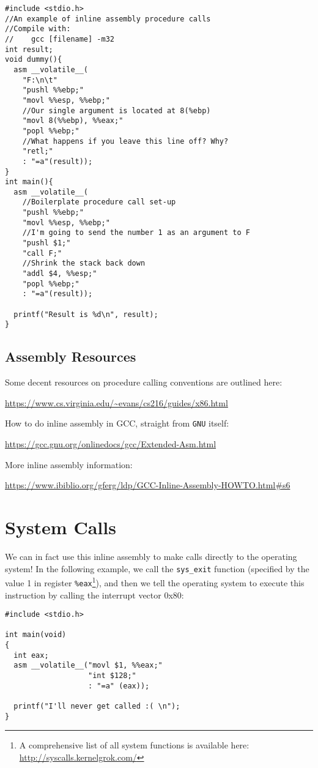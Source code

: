 \documentclass[10pt]{article}
\begin{document}
\begin{lstlisting}
#include <stdio.h>
//An example of inline assembly procedure calls
//Compile with:
//    gcc [filename] -m32
int result;
void dummy(){
  asm __volatile__(
    "F:\n\t"
    "pushl %%ebp;"
    "movl %%esp, %%ebp;"
    //Our single argument is located at 8(%ebp)
    "movl 8(%%ebp), %%eax;"
    "popl %%ebp;"
    //What happens if you leave this line off? Why?
    "retl;"
    : "=a"(result));
}
int main(){
  asm __volatile__(
    //Boilerplate procedure call set-up
    "pushl %%ebp;"
    "movl %%esp, %%ebp;"
    //I'm going to send the number 1 as an argument to F
    "pushl $1;"
    "call F;"
    //Shrink the stack back down
    "addl $4, %%esp;"
    "popl %%ebp;"
    : "=a"(result));

  printf("Result is %d\n", result);
}
\end{lstlisting}

\subsection{Assembly Resources}

\begin{itemize*}
\item Some decent resources on procedure calling conventions are outlined here: 

\url{https://www.cs.virginia.edu/~evans/cs216/guides/x86.html}

\item How to do inline assembly in GCC, straight from \texttt{GNU} itself: 

\url{https://gcc.gnu.org/onlinedocs/gcc/Extended-Asm.html}

\item More inline assembly information:

\url{https://www.ibiblio.org/gferg/ldp/GCC-Inline-Assembly-HOWTO.html#s6}

\end{itemize*}

\section{System Calls}
We can in fact use this inline assembly to make calls directly to the operating system! In the following example, we call the \texttt{sys\_exit} function (specified by the value 1 in register \texttt{\%eax}\footnote{A comprehensive list of all system functions is available here: \url{http://syscalls.kernelgrok.com/}}), and then we tell the operating system to execute this instruction by calling the interrupt vector 0x80:

\begin{lstlisting}
#include <stdio.h>

int main(void)
{
  int eax;
  asm __volatile__("movl $1, %%eax;"
                   "int $128;"
                   : "=a" (eax));

  printf("I'll never get called :( \n");
}
\end{lstlisting}
\end{document}
